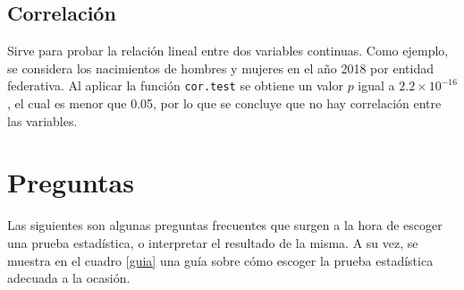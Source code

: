 \documentclass[12pt,letterpaper]{article}
\begin{document}
\subsection{Correlación}
Sirve para probar la relación lineal entre dos variables continuas. Como ejemplo, se considera los nacimientos de hombres y mujeres en el año 2018 por entidad federativa. Al aplicar la función \texttt{cor.test} se obtiene un valor $p$ igual a $2.2 \times 10^{-16}$, el cual es menor que 0.05, por lo que se concluye que no hay correlación entre las variables.




%
%
%
%
%
%
%
%

\appendix
\section{Preguntas} \label{apendice}
Las siguientes son algunas preguntas frecuentes que surgen a la hora de escoger una prueba estadística, o interpretar el resultado de la misma. A su vez, se muestra en el cuadro \ref{guia} una guía sobre cómo escoger la prueba estadística adecuada a la ocasión.
\end{document}
